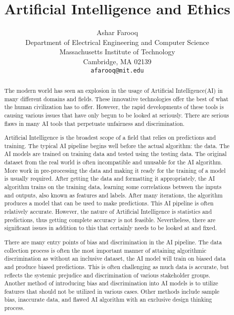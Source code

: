 \documentclass{article}
\title{Artificial Intelligence and Ethics}
\author{
  Ashar Farooq\\
  Department of Electrical Engineering and Computer Science\\
  Massachusetts Institute of Technology\\
  Cambridge, MA 02139 \\
  \texttt{afarooq@mit.edu} \\
}
\begin{document}
\maketitle
\begin{abstract}
The modern world has seen an explosion in the usage of Artificial Intelligence(AI) in many different domains and fields. These innovative technologies offer the best of what the human civilization has to offer. However, the rapid developments of these tools is causing various issues that have only begun to be looked at seriously. There are serious flaws in many AI tools that perpetuate unfairness and discrimination.  

\vspace{5mm} %

Artificial Intelligence is the broadest scope of a field that relies on predictions and training. The typical AI pipeline begins well before the actual algorithm: the data. The AI models are trained on training data and tested using the testing data. The original dataset from the real world is often incompatible and unusable for the AI algorithm. More work in pre-processing the data and making it ready for the training of a model is usually required. After getting the data and formatting it appropriately, the AI algorithm trains on the training data, learning some correlations between the inputs and outputs, also known as features and labels. After many iterations, the algorithm produces a model that can be used to make predictions. This AI pipeline is often relatively accurate. However, the nature of Artificial Intelligence is statistics and predictions, thus getting complete accuracy is not feasible. Nevertheless, there are significant issues in addition to this that certainly needs to be looked at and fixed. 

\vspace{5mm} %

There are many entry points of bias and discrimination in the AI pipeline. The data collection process is often the most important manner of attaining algorithmic discrimination as without an inclusive dataset, the AI model will train on biased data and produce biased predictions. This is often challenging as much data is accurate, but reflects the systemic prejudice and discrimination of various stakeholder groups. Another method of introducing bias and discrimination into AI models is to utilize features that should not be utilized in various cases. Other methods include sample bias, inaccurate data, and flawed AI algorithm with an exclusive design thinking process. 


\end{abstract}
\end{document}
